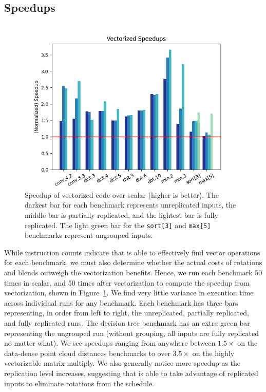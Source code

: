 \subsection{Speedups}\label{sec:speedups}

\begin{figure}[t]
	\centering
    \includegraphics[width=0.9\linewidth]{figures/graphs/vector_speedups.png}
    \caption{Speedup of vectorized code over scalar (higher is better). The darkest bar for each benchmark represents unreplicated inputs, the middle bar is partially replicated, and the lightest bar is fully replicated. The light green bar for the {\tt sort[3]} and {\tt max[5]} benchmarks represent ungrouped inputs.}\label{fig:vector-speedups}
\end{figure}

While instruction counts indicate that \system is able to effectively find vector operations for each benchmark, we must also determine whether the actual costs of rotations and blends outweigh the vectorization benefits. Hence, we run each benchmark 50 times in scalar, and 50 times after vectorization to compute the speedup from vectorization, shown in Figure~\ref{fig:vector-speedups}.
We find very little variance in execution time across individual runs for any benchmark.
Each benchmark has three bars representing, in order from left to right, the unreplicated, partially replicated, and fully replicated runs. 
The decision tree benchmark has an extra green bar representing the ungrouped run (without grouping, all inputs are fully replicated no matter what).
We see speedups ranging from anywhere between $1.5\times$ on the data-dense point cloud distances benchmarks to over $3.5\times$ on the highly vectorizable matrix multiply.
We also generally notice more speedup as the replication level increases, suggesting that \system is able to take advantage of replicated inputs to eliminate rotations from the schedule.

